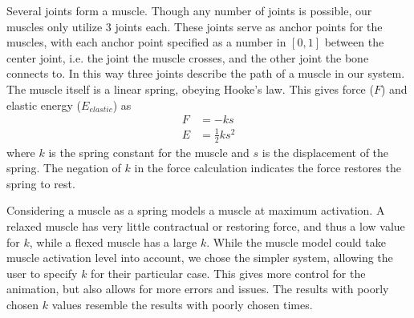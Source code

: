 Several joints form a muscle.  Though any number of joints is possible, our muscles only utilize 3 joints each.  These joints serve as anchor points for the muscles, with each anchor point specified as a number in $[0, 1]$ between the center joint, i.e. the joint the muscle crosses, and the other joint the bone connects to.  In this way three joints describe the path of a muscle in our system.  The muscle itself is a linear spring, obeying Hooke's law.  This gives force ($F$) and elastic energy ($E_{elastic}$) as
\begin{align*}
	F &= -ks \\
	E &= \frac{1}{2} k s^2
\end{align*}
where $k$ is the spring constant for the muscle and $s$ is the displacement of the spring.  The negation of $k$ in the force calculation indicates the force restores the spring to rest.

Considering a muscle as a spring models a muscle at maximum activation.  A relaxed muscle has very little contractual or restoring force, and thus a low value for $k$, while a flexed muscle has a large $k$.  While the muscle model could take muscle activation level into account, we chose the simpler system, allowing the user to specify $k$ for their particular case.  This gives more control for the animation, but also allows for more errors and issues.  The results with poorly chosen $k$ values resemble the results with poorly chosen times.

